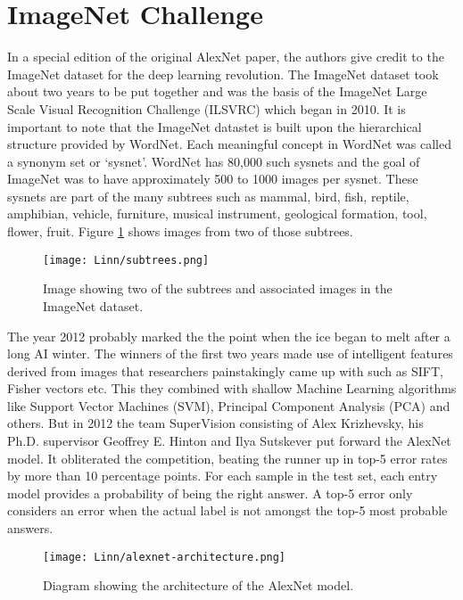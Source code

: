 \documentclass{../template/texnote}
\begin{document}
\section{ImageNet Challenge}
In a special edition of the original AlexNet paper, the authors give credit to the ImageNet dataset for the deep learning revolution.
The ImageNet dataset took about two years to be put together and was the basis of the ImageNet Large Scale Visual Recognition Challenge (ILSVRC) which began in 2010.
It is important to note that the ImageNet datastet is built upon the hierarchical structure provided by WordNet.
Each meaningful concept in WordNet was called a synonym set or `sysnet'.
WordNet has 80,000 such sysnets and the goal of ImageNet was to have approximately 500 to 1000 images per sysnet.
These sysnets are part of the many subtrees such as mammal, bird, fish, reptile, amphibian, vehicle, furniture, musical instrument, geological formation, tool, flower, fruit.
Figure \ref{fig:subtree} shows images from two of those subtrees.
    \begin{figure}
    \begin{center}
	\texttt{[image: Linn/subtrees.png]}
    \end{center}
    \caption{Image showing two of the subtrees and associated images in the ImageNet dataset.}
    \label{fig:subtree}
    \end{figure}
The year 2012 probably marked the the point when the ice began to melt after a long AI winter.
The winners of the first two years made use of intelligent features derived from images that researchers painstakingly came up with such as SIFT, Fisher vectors etc.
This they combined with shallow Machine Learning algorithms like Support Vector Machines (SVM), Principal Component Analysis (PCA) and others.
But in 2012 the team SuperVision consisting of Alex Krizhevsky, his Ph.D. supervisor Geoffrey E. Hinton and Ilya Sutskever put forward the AlexNet model.
It obliterated the competition, beating the runner up in top-5 error rates by more than 10 percentage points.
For each sample in the test set, each entry model provides a probability of being the right answer. A top-5 error only considers an error when the actual label 
is not amongst the top-5 most probable answers.
	\begin{figure}
	\begin{center}
		\texttt{[image: Linn/alexnet-architecture.png]}
	\end{center}
	\caption{Diagram showing the architecture of the AlexNet model.}
	\label{fig:alexnet}
	\end{figure}
\end{document}
